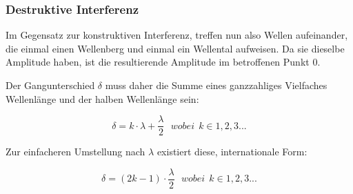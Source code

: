 	\subsubsection{Destruktive Interferenz}
	
	Im Gegensatz zur konstruktiven Interferenz, treffen nun also Wellen aufeinander, die einmal einen Wellenberg und einmal ein Wellental aufweisen. Da sie dieselbe Amplitude haben, ist die resultierende Amplitude im betroffenen Punkt $0$.
	
	Der Gangunterschied $\delta$ muss daher die Summe eines ganzzahliges Vielfaches Wellenlänge und der halben Wellenlänge sein:
	
	\begin{equation}
		\delta = k \cdot \lambda + \frac{\lambda}{2} \ \ \ wobei \ \ k \in 1,2,3...
	\end{equation}

	Zur einfacheren Umstellung nach $\lambda$ existiert diese, internationale Form:
	
	\begin{equation} \label{eq:des_interferenz}
		\delta = (2k -1) \cdot \frac{\lambda}{2} \ \ \ wobei \ \ k \in 1,2,3...
	\end{equation}